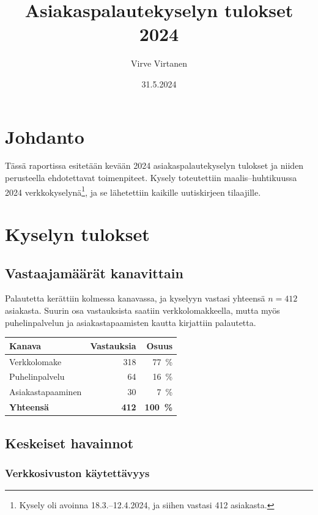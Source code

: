 \documentclass{sfs-2487-2024}
\date{31.5.2024}
\author{Virve Virtanen}
\title{Asiakaspalautekyselyn tulokset 2024}
\begin{document}
\maketitle

\tableofcontents

\section{Johdanto}

Tässä raportissa esitetään kevään 2024 asiakaspalautekyselyn tulokset
ja niiden perusteella ehdotettavat toimenpiteet. Kysely toteutettiin
maalis--huhtikuussa 2024 verkkokyselynä\footnote{Kysely oli avoinna
18.3.--12.4.2024, ja siihen vastasi 412 asiakasta.}, ja se lähetettiin
kaikille uutiskirjeen tilaajille.

\section{Kyselyn tulokset}

\subsection{Vastaajamäärät kanavittain}

Palautetta kerättiin kolmessa kanavassa, ja kyselyyn vastasi yhteensä
\(n = 412\) asiakasta. Suurin osa vastauksista saatiin
verkkolomakkeella, mutta myös puhelinpalvelun ja asiakastapaamisten
kautta kirjattiin palautetta.

\noindent\begin{tabular}{@{}lrr@{}}
  \toprule
  \textbf{Kanava} & \textbf{Vastauksia} & \textbf{Osuus} \\
  \midrule
  Verkkolomake    & 318                 & 77~\%          \\
  Puhelinpalvelu  & 64                  & 16~\%          \\
  Asiakastapaaminen & 30                & 7~\%           \\
  \midrule
  \textbf{Yhteensä} & \textbf{412}      & \textbf{100~\%} \\
  \bottomrule
\end{tabular}

\subsection{Keskeiset havainnot}

\subsubsection{Verkkosivuston käytettävyys}
\end{document}
